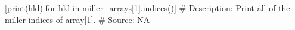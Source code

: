 [print(hkl) for hkl in miller_arrays[1].indices()]
# Description:  Print all of the miller indices of array[1].
# Source:  NA

